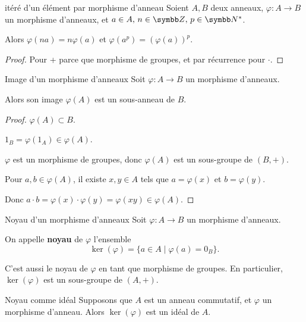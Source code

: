 \begin{proposition}{ itéré d'un élément par morphisme d'anneau }{}
    Soient $A, B$ deux anneaux, $\varphi : A \to B$ un morphisme d'anneaux, 
    et ${a \in A}, \, {n \in \Z}, \, {p \in \N^*}$. 

    Alors $\varphi(na) = n \varphi(a)$ et $\varphi(a^p) = (\varphi(a))^p$.

\end{proposition}

\begin{proof}
    Pour + parce que morphisme de groupes, et par récurrence pour $\cdot$.
\end{proof}

\begin{proposition}{Image d'un morphisme d'anneaux}{}
    Soit $\varphi : A \to B$ un morphisme d'anneaux. 

    Alors son image $\varphi(A)$ est un sous-anneau de $B$.
\end{proposition}

\begin{proof}
    $\varphi(A) \subset B$.

    $1_B = \varphi(1_A) \in \varphi(A)$.

    $\varphi$ est un morphisme de groupes, donc $\varphi(A)$ est un sous-groupe de $(B, +)$.

    Pour $a, b \in \varphi(A)$, il existe $x, y \in A$ tels que $a = \varphi(x)$ et $b = \varphi(y)$.

    Donc $a \cdot b = \varphi(x) \cdot \varphi(y) = \varphi(xy) \in \varphi(A)$.

\end{proof}

\begin{definition}{Noyau d'un morphisme d'anneaux}{}
    Soit $\varphi : A \to B$ un morphisme d'anneaux. 

    On appelle \textbf{noyau} de $\varphi$ l'ensemble 
    \[
        \ker(\varphi) = \{a \in A \mid \varphi(a) = 0_B\}.
    \]

    C'est aussi le noyau de $\varphi$ en tant que morphisme de groupes. En particulier, 
    $\ker(\varphi)$ est un sous-groupe de $(A, +)$.
    
\end{definition}

\begin{proposition}{Noyau comme idéal}{}
    Supposons que $A$ est un anneau commutatif, et $\varphi$ un morphisme d'anneau. 
    Alors $\ker(\varphi)$ est un idéal de $A$.
\end{proposition}

